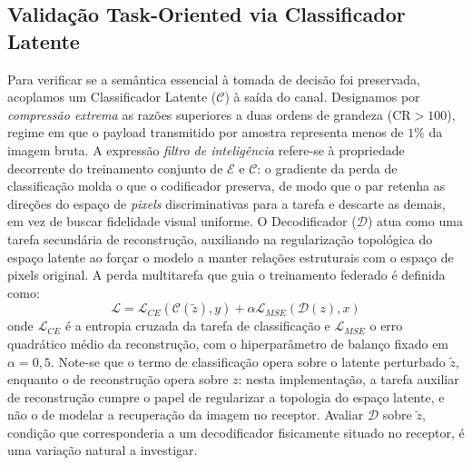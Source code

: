 \documentclass[conference]{IEEEtran}
\begin{document}
\subsection{Validação Task-Oriented via Classificador Latente}
Para verificar se a semântica essencial à tomada de decisão foi preservada, acoplamos um Classificador Latente ($\mathcal{C}$) à saída do canal. Designamos por \textit{compressão extrema} as razões superiores a duas ordens de grandeza ($\mathrm{CR} > 100$), regime em que o payload transmitido por amostra representa menos de $1\%$ da imagem bruta. A expressão \textit{filtro de inteligência} refere-se à propriedade decorrente do treinamento conjunto de $\mathcal{E}$ e $\mathcal{C}$: o gradiente da perda de classificação molda o que o codificador preserva, de modo que o par retenha as direções do espaço de \textit{pixels} discriminativas para a tarefa e descarte as demais, em vez de buscar fidelidade visual uniforme. O Decodificador ($\mathcal{D}$) atua como uma tarefa secundária de reconstrução, auxiliando na regularização topológica do espaço latente ao forçar o modelo a manter relações estruturais com o espaço de pixels original. A perda multitarefa que guia o treinamento federado é definida como:
\begin{equation}
    \mathcal{L} = \mathcal{L}_{CE}(\mathcal{C}(\tilde{z}), y) + \alpha \mathcal{L}_{MSE}(\mathcal{D}(z), x)
\end{equation}
onde $\mathcal{L}_{CE}$ é a entropia cruzada da tarefa de classificação e $\mathcal{L}_{MSE}$ o erro quadrático médio da reconstrução, com o hiperparâmetro de balanço fixado em $\alpha=0,5$. Note-se que o termo de classificação opera sobre o latente perturbado $\tilde{z}$, enquanto o de reconstrução opera sobre $z$: nesta implementação, a tarefa auxiliar de reconstrução cumpre o papel de regularizar a topologia do espaço latente, e não o de modelar a recuperação da imagem no receptor. Avaliar $\mathcal{D}$ sobre $\tilde{z}$, condição que corresponderia a um decodificador fisicamente situado no receptor, é uma variação natural a investigar.
\end{document}
